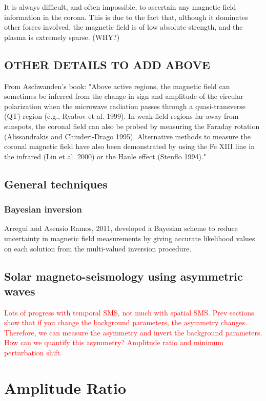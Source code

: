 \documentclass[12pt]{../style-files/ociamthesis}
\begin{document}
It is always difficult, and often impossible, to ascertain any magnetic field information in the corona. This is due to the fact that, although it dominates other forces involved, the magnetic field is of low absolute strength, and the plasma is extremely sparse. (WHY?)


\subsection{OTHER DETAILS TO ADD ABOVE}
From Aschwanden's book: "Above active regions, the magnetic field can sometimes be inferred from the change in sign and amplitude of the circular polarization when the microwave radiation passes through a quasi-transverse (QT) region (e.g., Ryabov et al. 1999). In weak-field regions far away from sunspots, the coronal field can also be probed by measuring the Faraday rotation (Alissandrakis  and Chiuderi-Drago 1995). Alternative methods to measure the coronal magnetic field have also been demonstrated by using the Fe XIII line in the infrared (Lin et al. 2000) or the Hanle effect (Stenflo 1994)."


\subsection{General techniques}
\subsubsection{Bayesian inversion}
Arregui and Asensio Ramos, 2011, developed a Bayesian scheme to reduce uncertainty in magnetic field measurements by giving accurate likelihood values on each solution from the multi-valued inversion procedure.


\subsection{Solar magneto-seismology using asymmetric waves}

\textcolor{red}{Lots of progress with temporal SMS, not much with spatial SMS. Prev sections show that if you change the background parameters, the asymmetry changes. Therefore, we can measure the asymmetry and invert the background parameters. How can we quantify this asymmetry? Amplitude ratio and minimum perturbation shift.}


\section{Amplitude Ratio}
\label{sec: AR}
\end{document}
